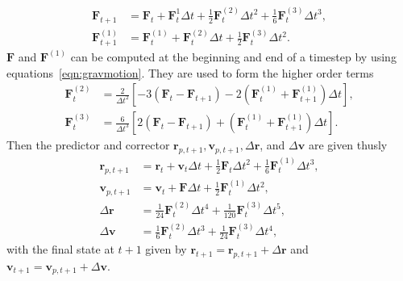 \documentclass{princeton_astro_thesis}
\numberwithin{equation}{section}
\begin{document}
\begin{subequations}
\begin{align}
    \mathbf{F}_{t+1} &= \mathbf{F}_{t} + \mathbf{F}^{1}_{t}\Delta t + \frac{1}{2}\mathbf{F}^{(2)}_{t}\Delta t^2 + \frac{1}{6}\mathbf{F}^{(3)}_{t}\Delta t^3, \\
    \mathbf{F}^{(1)}_{t+1} &= \mathbf{F}^{(1)}_{t} + \mathbf{F}^{(2)}_{t}\Delta t + \frac{1}{2}\mathbf{F}^{(3)}_{t} \Delta t^2.
\end{align}
\label{eqn:LowOrderHermite}
\end{subequations}
$\mathbf{F}$ and $\mathbf{F}^{(1)}$ can be computed at the beginning and end of a timestep by using equations~\ref{eqn:gravmotion}. They are used to form the higher order terms
\begin{subequations}
\begin{align}
    \mathbf{F}^{(2)}_{t} &= \frac{2}{\Delta t^2}\left[-3(\mathbf{F}_{t} -\mathbf{F}_{t+1}) - 2(\mathbf{F}^{(1)}_{t} + \mathbf{F}^{(1)}_{t+1}) \Delta t\right], \\
    \mathbf{F}^{(3)}_{t} &= \frac{6}{\Delta t^3}\left[2(\mathbf{F}_{t} - \mathbf{F}_{t+1}) + (\mathbf{F}^{(1)}_{t} + \mathbf{F}^{(1)}_{t+1})\Delta t\right].
\end{align}
\label{eqn:HigherOrderHermite}
\end{subequations}
Then the predictor and corrector $\mathbf{r}_{p, t+1}, \mathbf{v}_{p, t+1}, \Delta \mathbf{r}$, and $\Delta \mathbf{v}$ are given thusly
\begin{subequations}
\begin{align}
    \mathbf{r}_{p, t+1} &= \mathbf{r}_{t} + \mathbf{v}_{t} \Delta t + \frac{1}{2} \mathbf{F}_{t} \Delta t^2 + \frac{1}{6} \mathbf{F}^{(1)}_{t} \Delta t^3, \\
    \mathbf{v}_{p, t+1} &= \mathbf{v}_{t} + \mathbf{F} \Delta t + \frac{1}{2}\mathbf{F}^{(1)}_{t} \Delta t^2, \\
    \Delta \mathbf{r} &= \frac{1}{24} \mathbf{F}^{(2)}_{t} \Delta t^4 + \frac{1}{120}\mathbf{F}^{(3)}_{t} \Delta t^5, \\
    \Delta \mathbf{v} &= \frac{1}{6} \mathbf{F}^{(2)}_{t} \Delta t^3 + \frac{1}{24}\mathbf{F}^{(3)}_{t} \Delta t^4,
    \end{align}
\label{eqn:PredCorr}
\end{subequations}
with the final state at $t+1$ given by $\mathbf{r}_{t+1} = \mathbf{r}_{p, t+1} + \Delta \mathbf{r}$ and $ \mathbf{v}_{t+1} = \mathbf{v}_{p, t+1} + \Delta \mathbf{v}$. 
\end{document}
